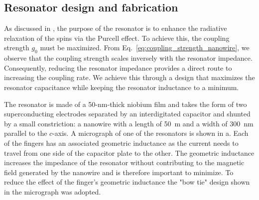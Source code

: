 
\subsection{Resonator design and fabrication}

As discussed in , the purpose of the resonator is to enhance the radiative relaxation of the spins via the Purcell effect. To achieve this, the coupling strength $g_0$ must be maximized. From Eq.~\ref{eq:coupling_strength_nanowire}, we observe that the coupling strength scales inversely with the resonator impedance. Consequently, reducing the resonator impedance provides a direct route to increasing the coupling rate. We achieve this through a design that maximizes the resonator capacitance while keeping the resonator inductance to a minimum. 

The resonator is made of a 50-nm-thick niobium film and takes the form of two superconducting electrodes separated by an interdigitated capacitor and shunted by a small constriction: a nanowire with a length of 50~\textmu m and a width of 300~nm parallel to the $c$-axis. A micrograph of one of the resonators is shown in a. Each of the fingers has an associated geometric inductance as the current needs to travel from one side of the capacitor plate to the other. The geometric inductance increases the impedance of the resonator without contributing to the magnetic field generated by the nanowire and is therefore important to minimize. To reduce the effect of the finger's geometric inductance the "bow tie" design shown in the micrograph was adopted.

